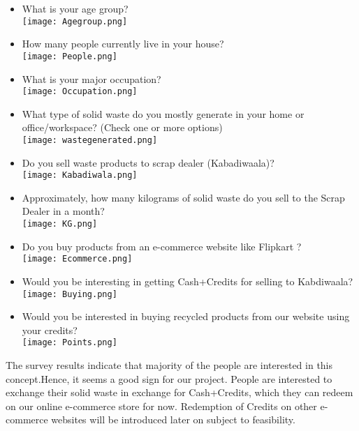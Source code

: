 \documentclass{article}
\begin{document}
\begin{itemize}

\item What is your age group?\\
\texttt{[image: Agegroup.png]}
\newpage
\item How many people currently live in your house?\\
\texttt{[image: People.png]}
\item What is your major occupation?\\
\texttt{[image: Occupation.png]}
\item What type of solid waste do you mostly generate in your home or office/workspace? (Check one or more options)\\
\texttt{[image: wastegenerated.png]}

\item Do you sell waste products to scrap dealer (Kabadiwaala)?\\
\texttt{[image: Kabadiwala.png]}
\newpage
\item Approximately, how many kilograms of solid waste do you sell to the Scrap Dealer in a month?\\
\texttt{[image: KG.png]}
\item Do you buy products from an e-commerce website like Flipkart  ?\\
\texttt{[image: Ecommerce.png]}
\item Would you be interesting in getting Cash+Credits for selling to Kabdiwaala?\\
\texttt{[image: Buying.png]}
\item Would you be interested in buying recycled products from our website using your credits?\\
\texttt{[image: Points.png]}
\end{itemize}

\newpage
\par The survey results indicate that majority of the people are interested in this concept.Hence, it seems a good sign for our project. People are interested to exchange their solid waste in exchange for Cash+Credits, which they can redeem on our online e-commerce store for now. Redemption of Credits on other e-commerce websites will be introduced later on subject to feasibility.
\end{document}
